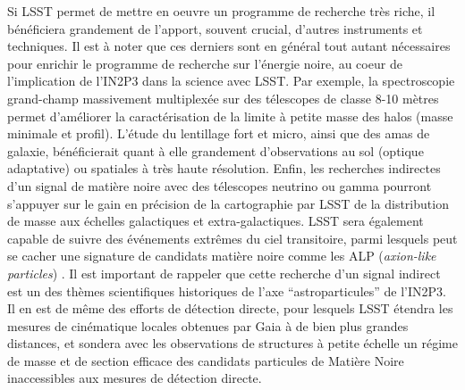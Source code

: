 \documentclass[12pt]{article}
\begin{document}
Si LSST permet de mettre en oeuvre un programme de recherche très riche, il bénéficiera grandement de l'apport, souvent crucial, d'autres instruments et techniques. Il est à noter que ces derniers sont en général tout autant nécessaires pour enrichir le programme de recherche sur l'énergie noire, au coeur de l'implication de l'IN2P3 dans la science avec LSST.
Par exemple, la spectroscopie grand-champ massivement multiplexée sur des télescopes de classe 8-10 mètres permet d'améliorer la caractérisation de la limite à petite masse des halos (masse minimale et profil).
L'étude du lentillage fort et micro, ainsi que des amas de galaxie, bénéficierait quant à elle grandement d'observations au sol (optique adaptative) ou spatiales à très haute résolution. Enfin, les recherches indirectes d'un signal de matière noire avec des télescopes neutrino ou gamma \citep{Charles:2016,Albert:2017,1404.5503} pourront s'appuyer sur le gain en précision de la cartographie par LSST de la distribution de masse aux échelles galactiques et extra-galactiques. LSST sera également capable de suivre des événements extrêmes du ciel transitoire, parmi lesquels peut se cacher une signature de candidats matière noire comme les ALP ({\it axion-like particles}) \citep{2017PhRvL.118a1103M}.
Il est important de rappeler que cette recherche d'un signal indirect est un des thèmes scientifiques historiques de l'axe ``astroparticules'' de l'IN2P3. Il en est de même des efforts de détection directe, pour lesquels LSST étendra les mesures de cinématique locales obtenues par Gaia à de bien plus grandes distances, et sondera avec les observations de structures à petite échelle un régime de masse et de section efficace des candidats particules de Matière Noire inaccessibles aux mesures de détection directe.

\end{document}
